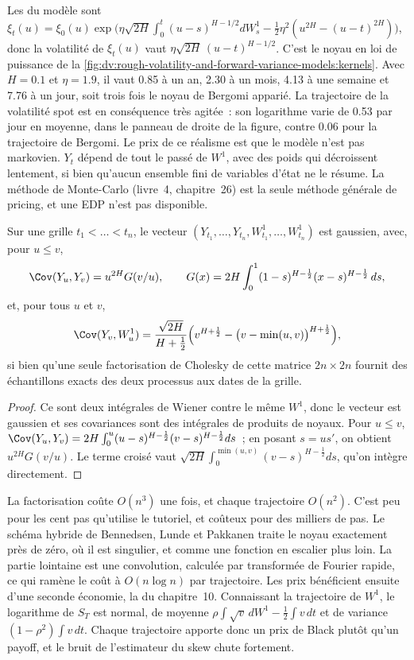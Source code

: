 Les  du modèle sont
$\xi_t(u)=\xi_0(u)\exp\bigl(\eta\sqrt{2H}\int_0^t(u-s)^{H-1/2}dW^1_s-\frac12\eta^2(u^{2H}-(u-t)^{2H})\bigr)$,
donc la volatilité de $\xi_t(u)$ vaut $\eta\sqrt{2H}\,(u-t)^{H-1/2}$. C'est le noyau en loi de puissance de la
\cref{fig:dv:rough-volatility-and-forward-variance-models:kernels}. Avec $H=0.1$ et $\eta=1.9$, il vaut 0.85 à un an,
2.30 à un mois, 4.13 à une semaine et 7.76 à un jour, soit trois fois le noyau de Bergomi apparié. La trajectoire
de la volatilité spot est en conséquence très agitée~: son logarithme varie de 0.53 par jour en moyenne, dans le panneau de droite de la
figure, contre 0.06 pour la trajectoire de Bergomi. Le prix de ce réalisme est que le modèle n'est
pas markovien. $Y_t$ dépend de tout le passé de $W^1$, avec des poids qui décroissent lentement, si bien qu'aucun
ensemble fini de variables d'état ne le résume. La méthode de Monte-Carlo (livre~4, chapitre~26) est la seule méthode générale de pricing, et une EDP
n'est pas disponible.

\begin{proposition}\label{prop:dv:rough-volatility-and-forward-variance-models:sim}
Sur une grille $t_1<\dots<t_n$, le vecteur $(Y_{t_1},\dots,Y_{t_n},W^1_{t_1},\dots,W^1_{t_n})$ est gaussien, avec, pour
$u\le v$,
\[
\Cov(Y_u,Y_v)=u^{2H}G(v/u),\qquad G(x)=2H\int_0^1(1-s)^{H-\frac12}(x-s)^{H-\frac12}\,ds,
\]
et, pour tous $u$ et $v$,
\[
\Cov(Y_v,W^1_u)=\frac{\sqrt{2H}}{H+\frac12}\Bigl(v^{H+\frac12}-\bigl(v-\min(u,v)\bigr)^{H+\frac12}\Bigr),
\]
si bien qu'une seule factorisation de Cholesky de cette matrice $2n\times2n$ fournit des échantillons exacts des deux processus aux dates de la grille.
\end{proposition}
\begin{proof}
Ce sont deux intégrales de Wiener contre le même $W^1$, donc le vecteur est gaussien et ses covariances sont des
intégrales de produits de noyaux. Pour $u\le v$,
$\Cov(Y_u,Y_v)=2H\int_0^u(u-s)^{H-\frac12}(v-s)^{H-\frac12}ds$~; en posant $s=us'$, on obtient $u^{2H}G(v/u)$.
Le terme croisé vaut $\sqrt{2H}\int_0^{\min(u,v)}(v-s)^{H-\frac12}ds$, qu'on intègre directement.
\end{proof}

La factorisation coûte $O(n^3)$ une fois, et chaque trajectoire $O(n^2)$. C'est peu pour les cent pas
qu'utilise le tutoriel, et coûteux pour des milliers de pas. Le schéma hybride de Bennedsen, Lunde et Pakkanen traite
le noyau exactement près de zéro, où il est singulier, et comme une fonction en escalier plus loin. La partie
lointaine est une convolution, calculée par transformée de Fourier rapide, ce qui ramène le coût à $O(n\log n)$ par
trajectoire. Les prix bénéficient ensuite d'une seconde économie, la  du chapitre~10. Connaissant
la trajectoire de $W^1$, le logarithme de $S_T$ est normal, de moyenne $\rho\int\sqrt v\,dW^1-\frac12\int v\,dt$ et de
variance $(1-\rho^2)\int v\,dt$. Chaque trajectoire apporte donc un prix de Black plutôt qu'un payoff, et le bruit de
l'estimateur du skew chute fortement.

